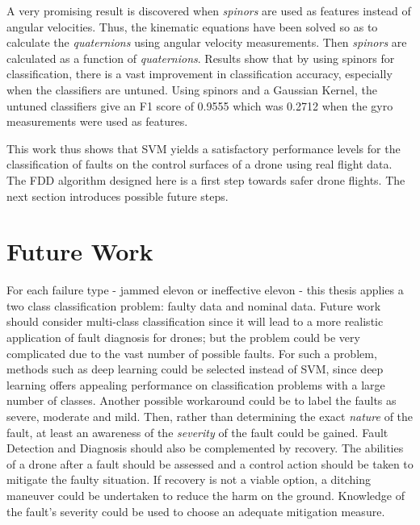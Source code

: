 A very promising result is discovered when \emph{spinors} are used as features instead of angular velocities. Thus, the kinematic equations have been solved so as to calculate the \emph{quaternions} using angular velocity measurements. Then \emph{spinors} are calculated as a function of \emph{quaternions}. Results show that by using spinors for classification, there is a vast improvement in classification accuracy, especially when the classifiers are untuned. Using spinors and a Gaussian Kernel, the untuned classifiers give an F1 score of 0.9555 which was 0.2712 when the gyro measurements were used as features. 

This work thus shows that SVM yields a satisfactory performance levels for the classification of faults on the control surfaces of a drone using real flight data. The FDD algorithm designed here is a first step towards safer drone flights. The next section introduces possible future steps. 

\section{Future Work}

For each failure type - jammed elevon or ineffective elevon - this thesis applies a two class classification problem: faulty data and nominal data. 
Future work should consider multi-class classification since it will lead to a more realistic application of fault diagnosis for drones; but the problem could be very complicated due to the vast number of possible faults. 
For such a problem, methods such as deep learning could be selected instead of SVM, since deep learning offers appealing performance on classification problems with a large number of classes. 
Another possible workaround could be to label the faults as severe, moderate and mild. Then, rather than determining the exact  \emph{nature} of the fault, at least an awareness of the  \emph{severity} of the fault could be gained.
Fault Detection and Diagnosis should also be complemented by recovery. The abilities of a drone after a fault should be assessed and a control action should be taken to mitigate the faulty situation. If recovery is not a viable option, a ditching maneuver could be undertaken to reduce the harm on the ground. Knowledge of the fault's severity could be used to choose an adequate mitigation measure.
